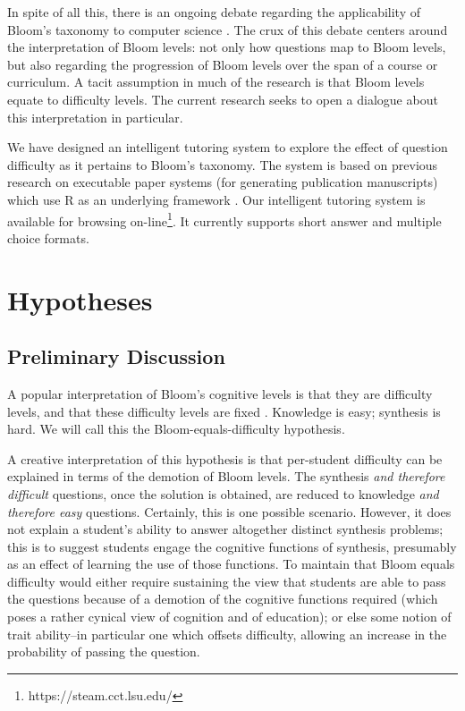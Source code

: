 \documentclass[a4paper,twocolumn]{article}
\begin{document}
In spite of all this, there is an ongoing debate regarding the applicability of
Bloom's taxonomy to computer science \cite{johnson2006bloom}
\cite{fuller2007developing}  \cite{thompson2008bloom}.  The crux of this debate
centers around the interpretation of Bloom levels: not only how questions map
to Bloom levels, but also regarding the progression of Bloom levels over the
span of a course or curriculum.  A tacit assumption in much of the research is
that Bloom levels equate to difficulty levels.  The current research seeks to
open a dialogue about this interpretation in particular.

We have designed an intelligent tutoring system to explore the effect of
question difficulty as it pertains to Bloom's taxonomy.  The system is based on
previous research on executable paper systems (for generating publication
manuscripts) which use R as an underlying framework \cite{castleberry2011}.
Our intelligent tutoring system is available for browsing
on-line\footnote{https://steam.cct.lsu.edu/}. It currently supports short
answer and multiple choice formats.

\section{Hypotheses}

\subsection{Preliminary Discussion}

A popular interpretation of Bloom's cognitive levels is that they are
difficulty levels, and that these difficulty levels are fixed
\cite{newman1988effect} \cite{oliver2004course} \cite{lord2007moving}
\cite{johnson2006bloom} \cite{fuller2007developing}.  Knowledge is easy;
synthesis is hard.  We will call this the Bloom-equals-difficulty hypothesis.

A creative interpretation of this hypothesis is that per-student difficulty can
be explained in terms of the demotion of Bloom levels.  The synthesis \emph{and
therefore difficult} questions, once the solution is obtained, are reduced to
knowledge \emph{and therefore easy} questions.  Certainly, this is one possible
scenario.  However, it does not explain a student's ability to answer
altogether distinct synthesis problems; this is to suggest students engage the
cognitive functions of synthesis, presumably as an effect of learning the use
of those functions.  To maintain that Bloom equals difficulty would either
require sustaining the view that students are able to pass the questions
because of a demotion of the cognitive functions required (which poses a rather
cynical view of cognition and of education); or else some notion of trait
ability--in particular one which offsets difficulty, allowing an increase in
the probability of passing the question.
\end{document}
